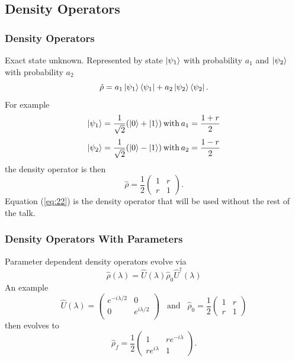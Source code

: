\documentclass{beamer}
\begin{document}
\subsection{\tiny{Density Operators}}
\begin{frame}
\frametitle{Density Operators}
Exact state unknown. Represented by state $\ket{\psi_1}$ with probability $a_1$ and $\ket{\psi_2}$ with probability $a_2$
\begin{equation}\label{eq:19}
\hat{\rho}=a_1\ket{\psi_1}\bra{\psi_1}+a_2\ket{\psi_2}\bra{\psi_2}.
\end{equation}
For example
\begin{equation}\label{eq:20}
\ket{\psi_1}=\frac{1}{\sqrt{2}}(\ket{0}+\ket{1}) \hspace{2pt} \text{with} \hspace{2pt} a_1=\frac{1+r}{2}
\end{equation}
\begin{equation}\label{eq:21}
\ket{\psi_2}=\frac{1}{\sqrt{2}}(\ket{0}-\ket{1}) \hspace{2pt} \text{with} \hspace{2pt} a_2=\frac{1-r}{2}
\end{equation}
the density operator is then
\begin{equation}\label{eq:22}
\hat{\rho}=\frac{1}{2}
\begin{pmatrix}
1 & r \\
r & 1
\end{pmatrix}.
\end{equation}
Equation (\ref{eq:22}) is the density operator that will be used without the rest of the talk.
\end{frame}
\begin{frame}
\frametitle{Density Operators With Parameters}
Parameter dependent density operators evolve via
\begin{equation}\label{eq:23}
\hat{\rho}(\lambda)=\hat{U}(\lambda)\hat{\rho}_0\hat{U}^{\dagger}(\lambda)
\end{equation}
An example 
\begin{equation}\label{eq:24}
\hat{U}(\lambda)=
\begin{pmatrix}
e^{-i\lambda/2} & 0 \\
0 & e^{i\lambda/2} \\
\end{pmatrix}
\hspace{10pt} \text{and} \hspace{10pt}
\hat{\rho}_0=\frac{1}{2}
\begin{pmatrix}
1 & r \\
r & 1
\end{pmatrix}
\end{equation}
then evolves to
\begin{equation}\label{eq:25}
\hat{\rho}_f=\frac{1}{2}
\begin{pmatrix}
1 & re^{-i\lambda} \\
re^{i\lambda} & 1
\end{pmatrix}.
\end{equation}
\end{frame}
\end{document}

